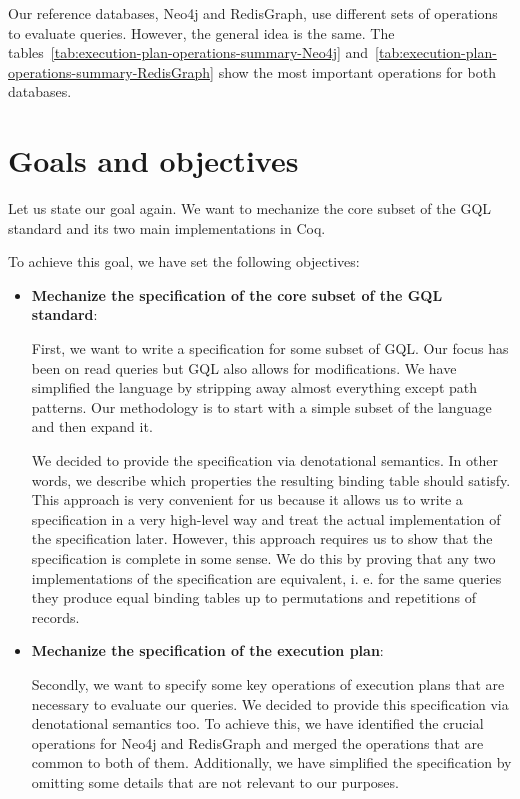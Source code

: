 \documentclass[14pt]{constructor-thesis}
\theoremstyle{definition}
\begin{document}
Our reference databases, Neo4j and RedisGraph, use different sets of operations to evaluate queries. However, the general idea is the same. The tables~\ref{tab:execution-plan-operations-summary-Neo4j} and~\ref{tab:execution-plan-operations-summary-RedisGraph} show the most important operations for both databases.

\section{Goals and objectives}

Let us state our goal again. We want to mechanize the core subset of the GQL standard and its two main implementations in Coq.

To achieve this goal, we have set the following objectives:
\begin{itemize}
  \item \textbf{Mechanize the specification of the core subset of the GQL standard}:
  
  First, we want to write a specification for some subset of GQL. Our focus has been on read queries but GQL also allows for modifications. We have simplified the language by stripping away almost everything except path patterns. Our methodology is to start with a simple subset of the language and then expand it.

  We decided to provide the specification via denotational semantics. In other words, we describe which properties the resulting binding table should satisfy. This approach is very convenient for us because it allows us to write a specification in a very high-level way and treat the actual implementation of the specification later. However, this approach requires us to show that the specification is complete in some sense. We do this by proving that any two implementations of the specification are equivalent, i. e. for the same queries they produce equal binding tables up to permutations and repetitions of records.

  \item \textbf{Mechanize the specification of the execution plan}:
  
  Secondly, we want to specify some key operations of execution plans that are necessary to evaluate our queries. We decided to provide this specification via denotational semantics too. To achieve this, we have identified the crucial operations for Neo4j and RedisGraph and merged the operations that are common to both of them. Additionally, we have simplified the specification by omitting some details that are not relevant to our purposes.


\end{itemize}
\end{document}
